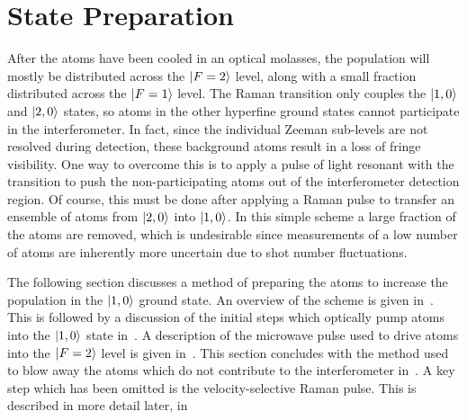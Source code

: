 \section{State Preparation}\label{sec:state_prep}
After the atoms have been cooled in an optical molasses, the population will mostly be distributed across the \(\ket{F=2}\) level, along with a small fraction distributed across the \(\ket{F=1}\) level. The Raman transition only couples the \(\ket{1,0}\) and \(\ket{2,0}\) states, so atoms in the other hyperfine ground states cannot participate in the interferometer. In fact, since the individual Zeeman sub-levels are not resolved during detection, these background atoms result in a loss of fringe visibility. One way to overcome this is to apply a pulse of light resonant with the  transition to push the non-participating atoms out of the interferometer detection region. Of course, this must be done after applying a Raman pulse to transfer an ensemble of atoms from \(\ket{2,0}\) into \(\ket{1,0}\). In this simple scheme a large fraction of the atoms are removed, which is undesirable since measurements of a low number of atoms are inherently more uncertain due to shot number fluctuations. 
\par\noindent
The following section discusses a method of preparing the atoms to increase the population in the \(\ket{1,0}\) ground state. An overview of the scheme is given in~. This is followed by a discussion of the initial steps which optically pump atoms into the \(\ket{1,0}\) state in~. A description of the microwave pulse used to drive atoms into the \(\ket{F=2}\) level is given in~. This section concludes with the method used to blow away the atoms which do not contribute to the interferometer in~. A key step which has been omitted is the velocity-selective Raman pulse. This is described in more detail later, in~
